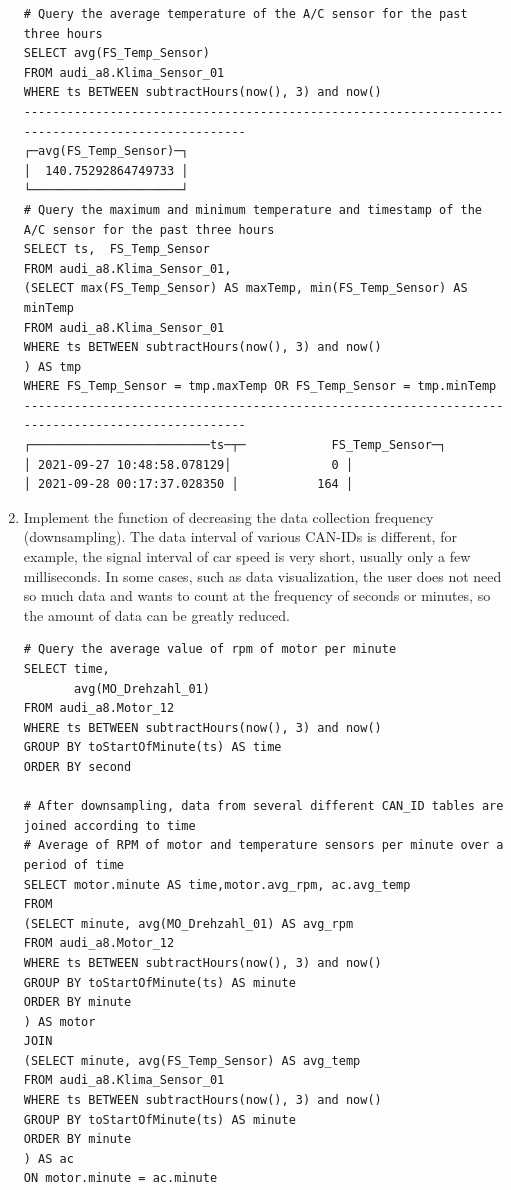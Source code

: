 \begin{enumerate}
        \begin{verbatim}
# Query the average temperature of the A/C sensor for the past three hours
SELECT avg(FS_Temp_Sensor) 
FROM audi_a8.Klima_Sensor_01
WHERE ts BETWEEN subtractHours(now(), 3) and now()
--------------------------------------------------------------------------------------------------
┌─avg(FS_Temp_Sensor)─┐
│  140.75292864749733 │
└─────────────────────┘
# Query the maximum and minimum temperature and timestamp of the A/C sensor for the past three hours
SELECT ts,  FS_Temp_Sensor 
FROM audi_a8.Klima_Sensor_01,
(SELECT max(FS_Temp_Sensor) AS maxTemp, min(FS_Temp_Sensor) AS minTemp
FROM audi_a8.Klima_Sensor_01 
WHERE ts BETWEEN subtractHours(now(), 3) and now()
) AS tmp
WHERE FS_Temp_Sensor = tmp.maxTemp OR FS_Temp_Sensor = tmp.minTemp
--------------------------------------------------------------------------------------------------
┌─────────────────────────ts─┬─            FS_Temp_Sensor─┐
│ 2021-09-27 10:48:58.078129│              0 │
│ 2021-09-28 00:17:37.028350 │           164 │
\end{verbatim}
    


\item Implement the function of decreasing the data collection frequency (downsampling). The data interval of various CAN-IDs is different, for example, the signal interval of car speed is very short, usually only a few milliseconds. In some cases, such as data visualization, the user does not need so much data and wants to count at the frequency of seconds or minutes, so the amount of data can be greatly reduced.

        \begin{verbatim}
# Query the average value of rpm of motor per minute
SELECT time,
       avg(MO_Drehzahl_01)
FROM audi_a8.Motor_12
WHERE ts BETWEEN subtractHours(now(), 3) and now()
GROUP BY toStartOfMinute(ts) AS time
ORDER BY second

# After downsampling, data from several different CAN_ID tables are joined according to time
# Average of RPM of motor and temperature sensors per minute over a period of time
SELECT motor.minute AS time,motor.avg_rpm, ac.avg_temp
FROM
(SELECT minute, avg(MO_Drehzahl_01) AS avg_rpm
FROM audi_a8.Motor_12
WHERE ts BETWEEN subtractHours(now(), 3) and now()
GROUP BY toStartOfMinute(ts) AS minute
ORDER BY minute
) AS motor
JOIN
(SELECT minute, avg(FS_Temp_Sensor) AS avg_temp
FROM audi_a8.Klima_Sensor_01
WHERE ts BETWEEN subtractHours(now(), 3) and now()
GROUP BY toStartOfMinute(ts) AS minute
ORDER BY minute
) AS ac
ON motor.minute = ac.minute


\end{verbatim}
\end{enumerate}
